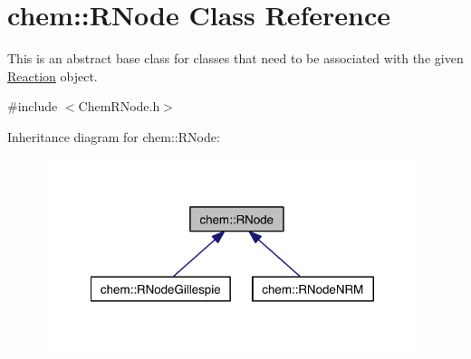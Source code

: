 \hypertarget{classchem_1_1RNode}{\section{chem\-:\-:R\-Node Class Reference}
\label{classchem_1_1RNode}
}


This is an abstract base class for classes that need to be associated with the given \hyperlink{classchem_1_1Reaction}{Reaction} object.  




{\ttfamily \#include $<$Chem\-R\-Node.\-h$>$}



Inheritance diagram for chem\-:\-:R\-Node\-:\nopagebreak
\begin{figure}[H]
\begin{center}
\leavevmode
\includegraphics[width=312pt]{classchem_1_1RNode__inherit__graph}
\end{center}
\end{figure}
